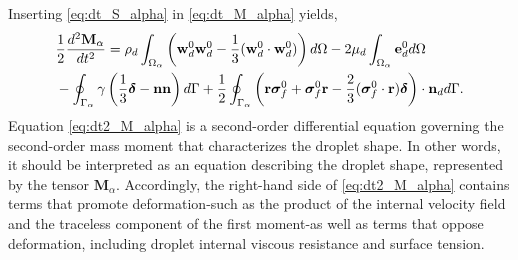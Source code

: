 Inserting \ref{eq:dt_S_alpha} in  \ref{eq:dt_M_alpha} yields,
\begin{align}    
    &\frac{1}{2}\frac{d^2 \textbf{M}_\alpha}{dt^2}
    =  \rho_d\intO{\left(\textbf{w}_d^0 \textbf{w}_d^0 -\frac{1}{3} (\textbf{w}_d^0 \cdot  \textbf{w}_d^0)\right)}
    - 2\mu_d\intO{\textbf{e}_d^0} \nonumber\\
    &- \intS{\gamma  
        \left( \frac{1}{3}\bm\delta - \textbf{nn} \right)
    }
    + \frac{1}{2}\intS{\left(\textbf{r}\bm\sigma_f^0+\bm\sigma_f^0\textbf{r}-\frac{2}{3}(\bm\sigma_f^0 \cdot \textbf{r})\bm\delta \right)\cdot \textbf{n}_d}.
    \label{eq:dt2_M_alpha}
\end{align}
Equation \ref{eq:dt2_M_alpha} is a second-order differential equation governing the second-order mass moment that characterizes the droplet shape. 
In other words, it should be interpreted as an equation describing the droplet shape, represented by the tensor $\textbf{M}_\alpha$.
Accordingly, the right-hand side of \ref{eq:dt2_M_alpha} contains terms that promote deformation-such as the product of the internal velocity field and the traceless component of the first moment-as well as terms that oppose deformation, including droplet internal viscous resistance and surface tension.
